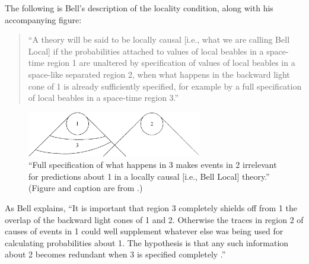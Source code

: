 \documentclass[aps,prc,onecolumn,12pt]{revtex4-2}
\begin{document}
The following is Bell's description of the locality condition, along with his
accompanying figure:
\begin{quote}
``A theory will be said to be locally causal [i.e., what we are calling
Bell Local] if the probabilities attached to values of local beables
in a space-time region 1 are unaltered by specification of values of
local beables in a space-like separated region 2, when what happens in
the backward light cone of 1 is already sufficiently specified, for
example by a full specification of local beables in a space-time
region 3.''  \cite[page 240]{bell}
\end{quote}

\begin{figure}[h]
\begin{center}
\includegraphics[width=3.0in,clip]{./belllocality.eps}
\end{center}
\caption{
\label{fig1}
``Full specification of what happens in 3 makes events in 2 irrelevant
for predictions about 1 in a locally causal [i.e., Bell Local]
theory.''  (Figure and caption are from \cite[pg. 240]{bell}.)
}
\end{figure}

As Bell explains, ``It is important that region 3
completely shields off from 1 the overlap of the backward light cones
of 1 and 2.  Otherwise the traces in region 2 of causes of events in 1
could well supplement whatever else was being used for calculating
probabilities about 1.  The hypothesis is that any such information
about 2 becomes redundant when 3 is specified
completely \cite[pg. 240]{bell}.''
\end{document}
